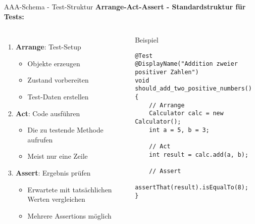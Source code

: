 \begin{frame}[fragile]{AAA-Schema - Test-Struktur}
  \textbf{Arrange-Act-Assert - Standardstruktur für Tests:}

  \begin{columns}[T]
    \begin{enumerate}
      \item \textbf{Arrange}: Test-Setup
        \begin{itemize}
          \item Objekte erzeugen
          \item Zustand vorbereiten
          \item Test-Daten erstellen
        \end{itemize}
      \item \textbf{Act}: Code ausführen
        \begin{itemize}
          \item Die zu testende Methode aufrufen
          \item Meist nur eine Zeile
        \end{itemize}
      \item \textbf{Assert}: Ergebnis prüfen
        \begin{itemize}
          \item Erwartete mit tatsächlichen Werten vergleichen
          \item Mehrere Assertions möglich
        \end{itemize}
    \end{enumerate}

    \begin{exampleblock}{Beispiel}
      \begin{lstlisting}[style=java, basicstyle=\tiny\ttfamily]
@Test
@DisplayName("Addition zweier positiver Zahlen")
void should_add_two_positive_numbers() {
    // Arrange
    Calculator calc = new Calculator();
    int a = 5, b = 3;

    // Act
    int result = calc.add(a, b);

    // Assert
    assertThat(result).isEqualTo(8);
}
      \end{lstlisting}
    \end{exampleblock}
  \end{columns}
\end{frame}

